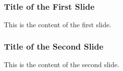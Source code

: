 \documentclass{beamer}
\begin{document}
\begin{frame}
    \frametitle{Title of the First Slide}
    This is the content of the first slide.
\end{frame}

\begin{frame}
    \frametitle{Title of the Second Slide}
    This is the content of the second slide.
\end{frame}
\end{document}
